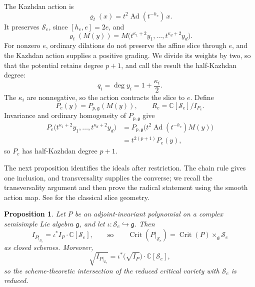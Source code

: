 \documentclass[10pt,reqno]{amsart}
\numberwithin{equation}{section}
\theoremstyle{plain}
\newtheorem{proposition}[theorem]{Proposition}
\theoremstyle{definition}
\DeclareMathOperator{\Crit}{Crit}
\DeclareMathOperator{\Ad}{Ad}
\begin{document}
The Kazhdan action \cite{GG} is
\begin{equation*}
	\varrho_t(x)=t^2\Ad(t^{-h_e})\,x .
\end{equation*}
It preserves $\mathcal{S}_e$, since $[h_e,e]=2e$, and
\begin{equation*}
	\varrho_t(M(y))=M\big(t^{\kappa_1+2}y_1,\dots,t^{\kappa_d+2}y_d\big).
\end{equation*}
For nonzero $e$, ordinary dilations do not preserve the affine slice through $e$, and the Kazhdan action supplies a positive grading. We divide its weights by two, so that the potential retains degree $p+1$, and call the result the half-Kazhdan degree:
\begin{equation*}
	q_i=\deg y_i=1+\frac{\kappa_i}2 .
\end{equation*}
The $\kappa_i$ are nonnegative, so the action contracts the slice to $e$. Define
\begin{equation*}
	P_e(y)=P_{p,\mathfrak{g}}(M(y)),\qquad R_e=\mathbb{C}[\mathcal{S}_e]/I_{P_e}.
\end{equation*}
Invariance and ordinary homogeneity of $P_{p,\mathfrak{g}}$ give
\begin{equation*}
\begin{aligned}
    P_e\big(t^{\kappa_1+2}y_1,\dots,t^{\kappa_d+2}y_d\big)
    &=P_{p,\mathfrak{g}}\big(t^2\Ad(t^{-h_e})M(y)\big)\\
    &=t^{2(p+1)}P_e(y),
\end{aligned}
\end{equation*}
so $P_e$ has half-Kazhdan degree $p+1$.

The next proposition identifies the ideals after restriction. The chain rule gives one inclusion, and transversality supplies the converse; we recall the transversality argument and then prove the radical statement using the smooth action map. See \cite{Slodowy,LNS} for the classical slice geometry.

\begin{proposition}\label{prop:slice}
Let $P$ be an adjoint-invariant polynomial on a complex semisimple Lie algebra $\mathfrak{g}$, and let $\iota:\mathcal{S}_e\hookrightarrow\mathfrak{g}$. Then
\begin{equation}\label{eq:slice-ideal}
	I_{P|_{\mathcal{S}_e}}=\iota^*I_P\cdot\mathbb{C}[\mathcal{S}_e],\qquad\text{so}\qquad \Crit(P|_{\mathcal{S}_e})=\Crit(P)\times_\mathfrak{g}\mathcal{S}_e
\end{equation}
as closed schemes. Moreover,
\begin{equation}\label{eq:slice-radical}
	\sqrt{I_{P|_{\mathcal{S}_e}}}=\iota^*\big(\sqrt{I_P}\big)\cdot\mathbb{C}[\mathcal{S}_e],
\end{equation}
so the scheme-theoretic intersection of the reduced critical variety with $\mathcal{S}_e$ is reduced.
\end{proposition}
\end{document}
